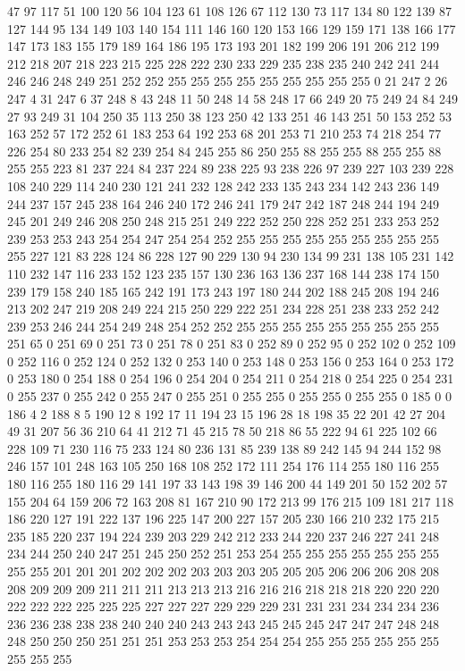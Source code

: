 47 97 117 51 100 120 56 104 123 61 108 126 67 112 130 73 117 134 80 122 139 87 127 144 95 134 149 103 140 154 111 146 160 120 153 166 129 159 171 138 166 177 147 173 183 155 179 189 164 186 195 173 193 201 182 199 206 191 206 212 199 212 218 207 218 223 215 225 228 222 230 233 229 235 238 235 240 242 241 244 246 246 248 249 251 252 252 255 255 255 255 255 255 255 255 255 0 21 247 2 26 247 4 31 247 6 37 248 8 43 248 11 50 248 14 58 248 17 66 249 20 75 249 24 84 249 27 93 249 31 104 250 35 113 250 38 123 250 42 133 251 46 143 251 50 153 252 53 163 252 57 172 252 61 183 253 64 192 253 68 201 253 71 210 253 74 218 254 77 226 254 80 233 254 82 239 254 84 245 255 86 250 255 88 255 255 88 255 255 88 255 255 223 81 237 224 84 237 224 89 238 225 93 238 226 97 239 227 103 239 228 108 240 229 114 240 230 121 241 232 128 242 233 135 243 234 142 243 236 149 244 237 157 245 238 164 246 240 172 246 241 179 247 242 187 248 244 194 249 245 201 249 246 208 250 248 
215 251 249 222 252 250 228 252 251 233 253 252 239 253 253 243 254 254 247 254 254 252 255 255 255 255 255 255 255 255 255 255 227 121 83 228 124 86 228 127 90 229 130 94 230 134 99 231 138 105 231 142 110 232 147 116 233 152 123 235 157 130 236 163 136 237 168 144 238 174 150 239 179 158 240 185 165 242 191 173 243 197 180 244 202 188 245 208 194 246 213 202 247 219 208 249 224 215 250 229 222 251 234 228 251 238 233 252 242 239 253 246 244 254 249 248 254 252 252 255 255 255 255 255 255 255 255 255 251 65 0 251 69 0 251 73 0 251 78 0 251 83 0 252 89 0 252 95 0 252 102 0 252 109 0 252 116 0 252 124 0 252 132 0 253 140 0 253 148 0 253 156 0 253 164 0 253 172 0 253 180 0 254 188 0 254 196 0 254 204 0 254 211 0 254 218 0 254 225 0 254 231 0 255 237 0 255 242 0 255 247 0 255 251 0 255 255 0 255 255 0 255 255 0 185 0 0 186 4 2 188 8 5 190 12 8 192 17 11 194 23 15 196 28 18 198 35 22 201 42 27 204 49 31 207 56 
36 210 64 41 212 71 45 215 78 50 218 86 55 222 94 61 225 102 66 228 109 71 230 116 75 233 124 80 236 131 85 239 138 89 242 145 94 244 152 98 246 157 101 248 163 105 250 168 108 252 172 111 254 176 114 255 180 116 255 180 116 255 180 116 29 141 197 33 143 198 39 146 200 44 149 201 50 152 202 57 155 204 64 159 206 72 163 208 81 167 210 90 172 213 99 176 215 109 181 217 118 186 220 127 191 222 137 196 225 147 200 227 157 205 230 166 210 232 175 215 235 185 220 237 194 224 239 203 229 242 212 233 244 220 237 246 227 241 248 234 244 250 240 247 251 245 250 252 251 253 254 255 255 255 255 255 255 255 255 255 201 201 201 202 202 202 203 203 203 205 205 205 206 206 206 208 208 208 209 209 209 211 211 211 213 213 213 216 216 216 218 218 218 220 220 220 222 222 222 225 225 225 227 227 227 229 229 229 231 231 231 234 234 234 236 236 236 238 238 238 240 240 240 243 243 243 245 245 245 247 247 247 248 248 248 250 250 250 251 251 251 253 253 253 254 254 254 255 255 255 255 255 255 255 255 255 
